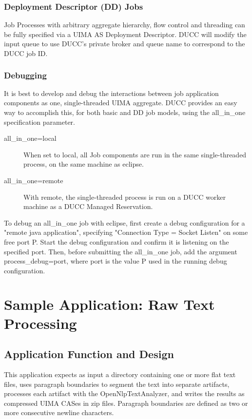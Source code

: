 \subsection{Deployment Descriptor (DD) Jobs}
Job Processes with arbitrary aggregate hierarchy, flow control and threading can be fully specified
via a UIMA AS Deployment Descriptor. DUCC will modify the input queue to use DUCC's private
broker and queue name to correspond to the DUCC job ID.

\subsection{Debugging}
It is best to develop and debug the interactions between job application components as one, 
single-threaded UIMA aggregate. DUCC provides an easy way to accomplish this, for both basic
and DD job models, using the all\_in\_one specification parameter.

\begin{description}
    \item[all\_in\_one=local] When set to local, all Job components are run in the same
      single-threaded process, on the same machine as eclipse.
    \item[all\_in\_one=remote] With remote, the single-threaded process is run on a DUCC
      worker machine as a DUCC Managed Reservation. 
\end{description}

To debug an all\_in\_one job with eclipse, first create a debug configuration for a
"remote java application", specifying "Connection Type = Socket Listen" on some
free port P. Start the debug configuration and confirm it is listening on the specified port.
Then, before submitting the all\_in\_one job, add the argument process\_debug=port, 
where port is the value P used in the running debug configuration.


\chapter{Sample Application: Raw Text Processing}

\section{Application Function and Design}
This application expects as input a directory containing one or more flat text files, 
uses paragraph boundaries to segment the text into separate artifacts, 
processes each artifact with the OpenNlpTextAnalyzer, and writes
the results as compressed UIMA CASes in zip files. Paragraph boundaries are defined as
two or more consecutive newline characters.

